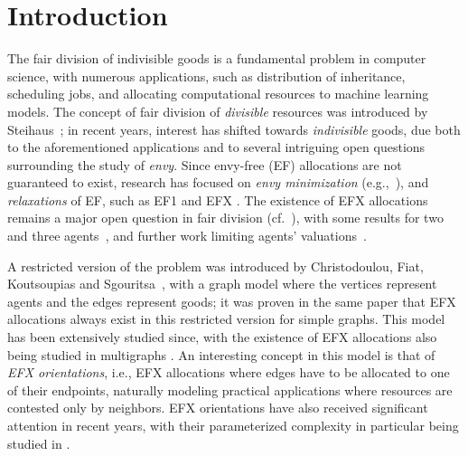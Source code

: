 \section{Introduction}\label{sec:introduction}






    The fair division of indivisible goods is a fundamental problem in computer science, with numerous applications, such as distribution of inheritance, scheduling jobs, and allocating computational resources to machine learning models. The concept of fair division of \emph{divisible} resources was introduced by Steihaus~\cite{h__steihaus_1948}; in recent years, interest has shifted towards \emph{indivisible} goods, due both to the aforementioned applications and to several intriguing open questions surrounding the study of \emph{envy}. Since envy-free (EF) allocations are not guaranteed to exist, research has focused on \emph{envy minimization} (e.g.,~\cite{ISAAC_envy_ratio,LiptonEtAl,Nguyen_Rothe}),
    and \emph{relaxations} of EF, such as EF1 \cite{budish} and EFX \cite{EFXCara,Laurent_EFX}. The existence of EFX allocations remains a major open question in fair division (cf.~\cite{FD_survey}),
    with some results for two~\cite{PlautRough} and three agents~\cite{akrami2022efxallocationssimplificationsimprovements,CGM24}, and further work limiting agents' valuations~\cite{TwoValuedInstanses,babaioff2020fairtruthfulmechanismsdichotomous,DBLP:conf/aaai/HosseiniSVX21,efxexistsfor3typesofadditiveagents}.

    A restricted version of the problem was introduced by Christodoulou, Fiat, Koutsoupias and Sgouritsa~\cite{EFXgraphs}, with a graph model where the vertices represent agents and the edges represent goods; it was proven in the same paper that EFX allocations always exist in this restricted version for simple graphs. This model has been extensively studied since, with the existence of EFX allocations also being studied in multigraphs \cite{AfshinmehretTriangleFree,AfshinmehrDKMR25,bhaskar_et_al:LIPIcs.FSTTCS.2025.15_efxallocationsmultigraphclasses,kaviani2024envyfreeallocationindivisiblegoods,OntheExistenceofEFXAllocationsinMultigraphs}. An interesting concept in this model is that of \emph{EFX orientations}, i.e., EFX allocations where edges have to be allocated to one of their endpoints, naturally modeling practical applications where resources are contested only by neighbors. EFX orientations have also received significant attention in recent years, with their parameterized complexity in particular being studied in \cite{AfshinmehrDKMR25,sagt/BlazejGRS25,ijcai/DeligkasEGK25}.


